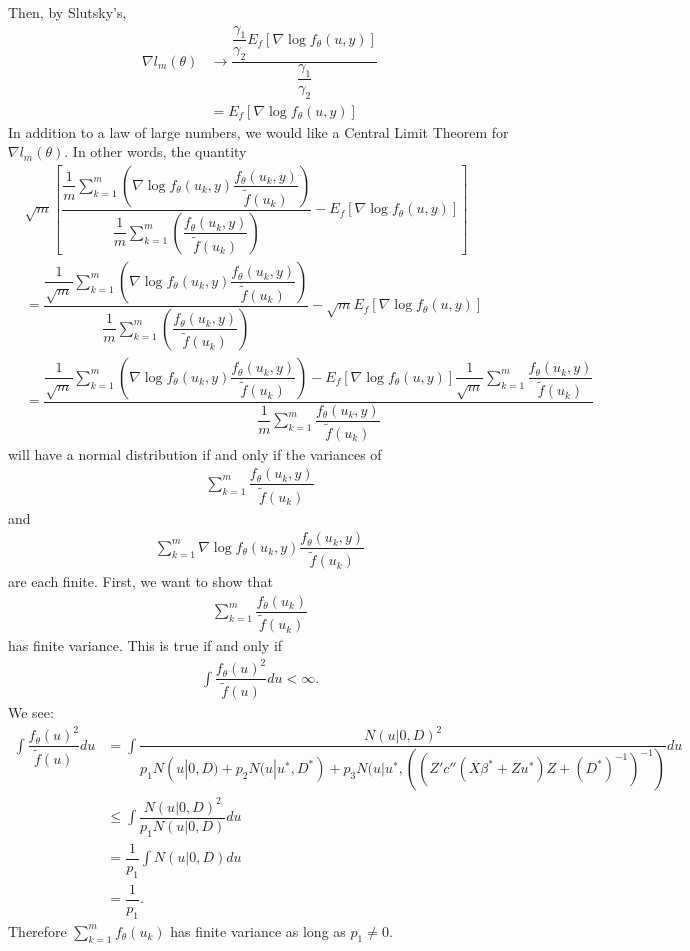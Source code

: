 \documentclass{article}
\begin{document}
Then, by Slutsky's,
\begin{align}
\nabla l_m(\theta)&\rightarrow \dfrac{  \dfrac{\gamma_1}{\gamma_2} E_f \left[ \nabla \log f_\theta(u,y)  \right] }{\dfrac{\gamma_1}{\gamma_2}}\\
&=  E_f \left[ \nabla \log f_\theta(u,y)  \right]
\end{align}
In addition to a law of large numbers, we would like a Central Limit Theorem for $\nabla l_m(\theta)$. In other words, the quantity
\begin{align}
&\sqrt{m} \left[  \dfrac{\dfrac{1}{m}\sum_{k=1}^m    \left( \nabla \log f_\theta(u_k,y)   \dfrac{f_\theta(u_k,y)}{\tilde{f}(u_k)} \right)}{\dfrac{1}{m} \sum_{k=1}^m \left( \dfrac{f_\theta(u_k,y)}{\tilde{f}(u_k)} \right) }- E_f \left[ \nabla \log f_\theta(u,y)  \right]  \right] \\
&=
\dfrac{\dfrac{1}{\sqrt{m}}\sum_{k=1}^m    \left( \nabla \log f_\theta(u_k,y)   \dfrac{f_\theta(u_k,y)}{\tilde{f}(u_k)} \right)}{\dfrac{1}{m} \sum_{k=1}^m \left( \dfrac{f_\theta(u_k,y)}{\tilde{f}(u_k)} \right) }- \sqrt{m} E_f \left[ \nabla \log f_\theta(u,y)  \right]  \\
&=\dfrac{\dfrac{1}{\sqrt{m}}\sum_{k=1}^m    \left( \nabla \log f_\theta(u_k,y)\dfrac{f_\theta(u_k,y)}{\tilde{f}(u_k)} \right)
 - E_f \left[ \nabla \log f_\theta(u,y)  \right] \dfrac{1}{\sqrt{m}}\sum_{k=1}^m  \dfrac{f_\theta(u_k,y)}{\tilde{f}(u_k)} }{\dfrac{1}{m} \sum_{k=1}^m  \dfrac{f_\theta(u_k,y)}{\tilde{f}(u_k)} }   
\end{align}
will have a normal distribution if and only if the variances of
\begin{align}
\sum_{k=1}^m  \dfrac{f_\theta(u_k,y)}{\tilde{f}(u_k)}
\end{align}
and
\begin{align}
\sum_{k=1}^m     \nabla \log f_\theta(u_k,y)\dfrac{f_\theta(u_k,y)}{\tilde{f}(u_k)} 
\end{align}
are each finite.
First, we want to show that
\begin{align}
\sum_{k=1}^m \dfrac{f_\theta(u_k)}{\tilde{f}(u_k)}
\end{align}
has finite variance. This is true if and only if 
\begin{align}
\int \dfrac{f_\theta(u)^2}{\tilde{f}(u)} du < \infty.
\end{align}
We see:
\begin{align}
\int \dfrac{f_\theta(u)^2}{\tilde{f}(u)} du &= \int \dfrac{N(u|0,D)^2}{p_1 N(u|0,D)+p_2 N(u|u^*, D^*) + p_3 N(u|u^*, ((Z'  c''(X \beta^*+Zu^*) Z +(D^*)^{-1}   )^{-1})} du \\
& \leq \int \dfrac{N(u|0,D)^2}{p_1 N(u|0,D)} du \\
&= \dfrac{1}{p_1} \int N(u|0,D) du \\
&= \dfrac{1}{p_1}.
\end{align}
Therefore $\sum_{k=1}^m f_\theta(u_k)$ has finite variance as long as $p_1\neq 0$.
\end{document}
